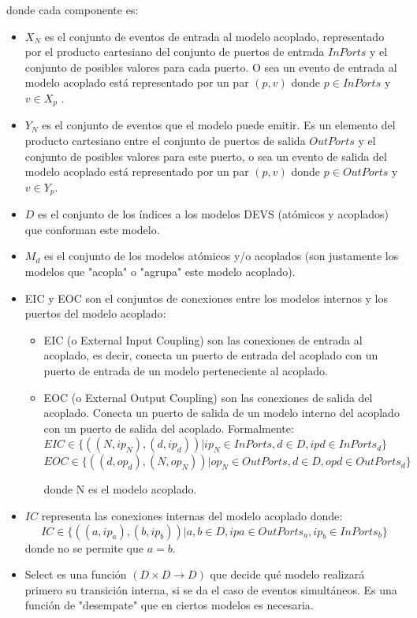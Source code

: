 \documentclass[a4paper,	11pt]{report}
\begin{document}
donde cada componente es:
\begin{itemize}
\item $X_N$ es el conjunto de eventos de entrada al modelo acoplado, representado por el producto cartesiano del conjunto de puertos de entrada $InPorts$ y el conjunto de posibles valores para cada puerto. O sea un evento de entrada al modelo acoplado está representado por un par $(p, v)$ donde $p \in InPorts$ y $v \in X_p$ .

\item $Y_N$ es el conjunto de eventos que el modelo puede emitir. Es un elemento del producto cartesiano entre el conjunto de puertos de salida $OutPorts$ y el conjunto de posibles valores para este puerto, o sea un evento de salida del modelo acoplado está representado por un par $(p, v)$ donde $p \in OutPorts$ y $v \in Y_p$.

\item $D$ es el conjunto de los índices a los modelos DEVS (atómicos y acoplados) que conforman este modelo. 

\item ${M_d}$ es el conjunto de los modelos atómicos y/o acoplados (son justamente los modelos que "acopla" o "agrupa" este modelo acoplado).

\item EIC y EOC son el conjuntos de conexiones entre los modelos internos y los puertos del modelo acoplado:
      \begin {itemize}
          \item EIC (o External Input Coupling) son las conexiones de entrada al acoplado, es decir, conecta un puerto de entrada del acoplado con un puerto de entrada de un modelo perteneciente al acoplado.
          \item EOC (o External Output Coupling) son las conexiones de salida del acoplado. Conecta un puerto de salida de un modelo interno del acoplado con un puerto de salida del acoplado. Formalmente:
          $EIC \in \{((N, ip_N ), (d, ip_d )) | ip_N \in InPorts, d \in D, ip d \in InPorts_d \} $
          $EOC \in \{((d, op_d ), (N, op_N ))  | op_N \in OutPorts, d \in D, op d \in OutPorts_d \} $
    
    	donde N es el modelo acoplado.
      \end{itemize}

\item $IC$ representa las conexiones internas del modelo acoplado donde:
\begin{equation}
IC \in \{((a, ip_a ), (b, ip_b )) | a, b \in D, ip a \in OutPorts_a , ip_b \in InPorts_b \}
\end{equation}
donde no se permite que $a = b$.

\item Select es una función $(D \times D \to D)$ que decide qué modelo realizará primero su transición interna, si se da el caso de eventos simultáneos. Es una función de "desempate" que en ciertos modelos es necesaria.
\end{itemize}
\end{document}
